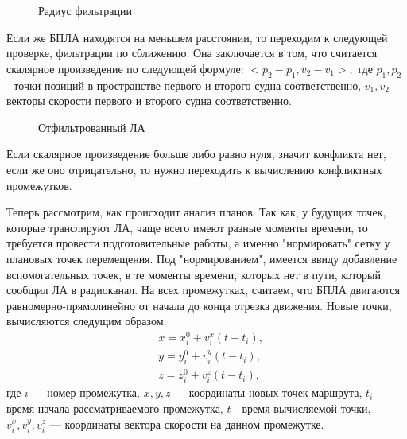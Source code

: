 \documentclass[a4paper,12pt]{article}
\begin{document}
\begin{figure}[ht!]
    \caption{Радиус фильтрации}\label{radius_filter}
\end{figure}

Если же БПЛА находятся на меньшем расстоянии, то переходим к следующей проверке, фильтрации по сближению. Она заключается в том, что считается скалярное произведение по следующей формуле:
$<p_2 - p_1, v_2 - v_1 >,$
где $p_1, p_2$ - точки позиций в пространстве первого и второго судна соответственно, 
$v_1, v_2$ - векторы скорости первого и второго судна соответственно.
\begin{figure}[ht!]
    \caption{Отфильтрованный ЛА}\label{check_scalar_product}
\end{figure}

Если скалярное произведение больше либо равно нуля, значит конфликта нет, если же оно отрицательно, то нужно переходить к вычислению конфликтных промежутков.

Теперь рассмотрим, как происходит анализ планов. Так как, у будущих точек, которые транслируют ЛА, чаще всего имеют разные моменты времени, то требуется провести подготовительные работы, а именно "нормировать" сетку у плановых точек перемещения. Под "нормированием", имеется ввиду добавление вспомогательных точек, в те моменты времени, которых нет в пути, который сообщил ЛА в радиоканал. На всех промежутках, считаем, что БПЛА двигаются равномерно-прямолинейно от начала до конца отрезка движения. Новые точки, вычисляются следущим образом:
\begin{align*}
    &x = x_i^0 + v_i^x(t - t_{i}),\\
    &y = y_i^0 + v_i^y(t - t_{i}),\\
    &z = z_i^0 + v_i^z(t - t_{i}),
\end{align*}
где $i$ --- номер промежутка, $x, y, z$ --- координаты новых точек маршрута, $t_i$ --- время начала рассматриваемого промежутка, $t$ - время вычисляемой точки, $v_i^x,v_i^y,v_i^z$ --- координаты вектора скорости на данном промежутке.
\end{document}
